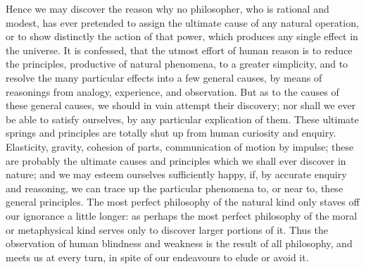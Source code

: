 \documentclass[]{article}
\begin{document}
\begin{sectionbody}
\humeparagraph  Hence we may discover the reason why no philosopher, who is rational and modest, has ever pretended to assign the ultimate cause of any natural operation, or to show distinctly the action of that power, which produces any single effect in the universe. It is confessed, that the utmost effort of human reason is to reduce the principles, productive of natural phenomena, to a greater simplicity, and to resolve the many particular effects into a few general causes, by means of reasonings from analogy, experience, and observation. But as to the causes of these general causes, we should in vain attempt their discovery; nor shall we ever be able to satisfy ourselves, by any particular explication of them. These ultimate springs and principles are totally shut up from human curiosity and enquiry. Elasticity, gravity, cohesion of parts, communication of motion by impulse; these are probably the ultimate causes and principles which we shall ever discover in nature; and we may esteem ourselves sufficiently happy, if, by accurate enquiry and reasoning, we can trace up the particular phenomena to, or near to, these general principles. The most perfect philosophy of the natural kind only staves off our ignorance a little longer: as perhaps the most perfect philosophy of the moral or metaphysical kind serves only to discover larger portions of it. Thus the observation of human blindness and weakness is the result of all philosophy, and meets us at every turn, in spite of our endeavours to elude or avoid it.


\end{sectionbody}
\end{document}
